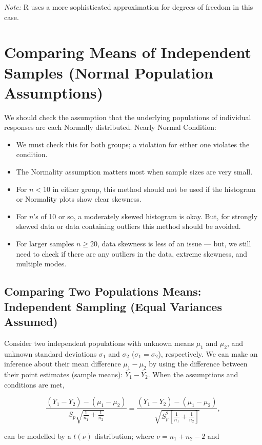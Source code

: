 \textit{Note:} R uses a more sophisticated approximation for degrees of freedom in this case.
\section*{Comparing Means of Independent Samples (Normal Population Assumptions)}

We should check the assumption that the underlying populations of individual responses are each Normally distributed. Nearly Normal Condition:

\begin{itemize}
  \item We must check this for both groups; a violation for either one violates the condition.
  \item The Normality assumption matters most when sample sizes are very small.
  \item For $n < 10$ in either group, this method should not be used if the histogram or Normality plots show clear skewness.
  \item For $n$’s of 10 or so, a moderately skewed histogram is okay. But, for strongly skewed data or data containing outliers this method should be avoided.
  \item For larger samples $n \geq 20$, data skewness is less of an issue — but, we still need to check if there are any outliers in the data, extreme skewness, and multiple modes.
\end{itemize}
\subsection{Comparing Two Populations Means: Independent Sampling (Equal Variances Assumed)}

Consider two independent populations with unknown means $\mu_1$ and $\mu_2$, and unknown standard deviations $\sigma_1$ and $\sigma_2$ ($\sigma_1 = \sigma_2$), respectively. We can make an inference about their mean difference $\mu_1 - \mu_2$ by using the difference between their point estimates (sample means): $\bar{Y}_1 - \bar{Y}_2$. When the assumptions and conditions are met,

\[
\frac{(\bar{Y}_1 - \bar{Y}_2) - (\mu_1 - \mu_2)}{S_p \sqrt{\frac{1}{n_1} + \frac{1}{n_2}}}
= \frac{(\bar{Y}_1 - \bar{Y}_2) - (\mu_1 - \mu_2)}{\sqrt{S_p^2 \left[\frac{1}{n_1} + \frac{1}{n_2} \right] }},
\]

can be modelled by a $t(\nu)$ distribution; where $\nu = n_1 + n_2 - 2$ and

